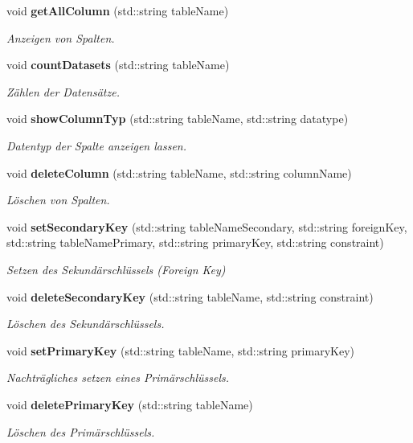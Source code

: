 \begin{DoxyCompactItemize}
void \textbf{ get\+All\+Column} (std\+::string table\+Name)
\begin{DoxyCompactList}\small\item\em Anzeigen von Spalten. \end{DoxyCompactList}\item 
void \textbf{ count\+Datasets} (std\+::string table\+Name)
\begin{DoxyCompactList}\small\item\em Zählen der Datensätze. \end{DoxyCompactList}\item 
void \textbf{ show\+Column\+Typ} (std\+::string table\+Name, std\+::string datatype)
\begin{DoxyCompactList}\small\item\em Datentyp der Spalte anzeigen lassen. \end{DoxyCompactList}\item 
void \textbf{ delete\+Column} (std\+::string table\+Name, std\+::string column\+Name)
\begin{DoxyCompactList}\small\item\em Löschen von Spalten. \end{DoxyCompactList}\item 
void \textbf{ set\+Secondary\+Key} (std\+::string table\+Name\+Secondary, std\+::string foreign\+Key, std\+::string table\+Name\+Primary, std\+::string primary\+Key, std\+::string constraint)
\begin{DoxyCompactList}\small\item\em Setzen des Sekundärschlüssels (Foreign Key) \end{DoxyCompactList}\item 
void \textbf{ delete\+Secondary\+Key} (std\+::string table\+Name, std\+::string constraint)
\begin{DoxyCompactList}\small\item\em Löschen des Sekundärschlüssels. \end{DoxyCompactList}\item 
void \textbf{ set\+Primary\+Key} (std\+::string table\+Name, std\+::string primary\+Key)
\begin{DoxyCompactList}\small\item\em Nachträgliches setzen eines Primärschlüssels. \end{DoxyCompactList}\item 
void \textbf{ delete\+Primary\+Key} (std\+::string table\+Name)
\begin{DoxyCompactList}\small\item\em Löschen des Primärschlüssels. \end{DoxyCompactList}\end{DoxyCompactItemize}


